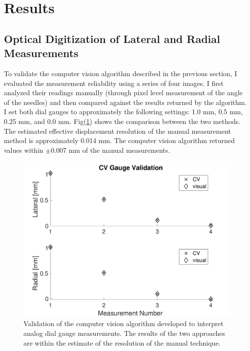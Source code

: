 \documentclass[journal]{IEEEtran}
\begin{document}
\section{Results}
\subsection{Optical Digitization of Lateral and Radial Measurements}
To validate the computer vision algorithm described in the previous section, I evaluated the measurement reliability using a series of four images.  I first analyzed their readings manually (through pixel level measurement of the angle of the needles) and then compared against the results returned by the algorithm.  I set both dial gauges to approximately the following settings:  1.0 mm, 0.5 mm, 0.25 mm, and 0.0 mm.  Fig(\ref{fig:cv}) shows the comparison between the two methods.  The estimated effective displacement resolution of the manual measurement method is approximately 0.014 mm.  The computer vision algorithm returned values within $\pm$0.007 mm of the manual measurements. 
\begin{figure}[!t]
\centering
\includegraphics[width=3.25 in]{./figs/CV}
\caption{Validation of the computer vision algorithm developed to interpret analog dial gauge measurements. The results of the two approaches are within the estimate of the resolution of the manual technique.}
\label{fig:cv}
\end{figure}
\end{document}
